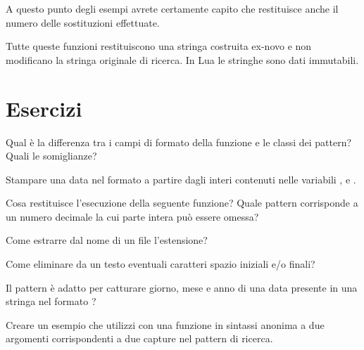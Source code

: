 A questo punto degli esempi avrete certamente capito che  restituisce
anche il numero delle sostituzioni effettuate.

Tutte queste funzioni restituiscono una stringa costruita ex-novo e non
modificano la stringa originale di ricerca. In Lua le stringhe sono dati
immutabili.



\section{Esercizi}

\begin{Exercise}[label=libstd-01]
Qual è la differenza tra i campi di formato della funzione  e
le classi dei pattern? Quali le somiglianze?
\end{Exercise}

\begin{Exercise}[label=libstd-02]
Stampare una data nel formato  a partire dagli interi contenuti
nelle variabili ,  e .
\end{Exercise}

\begin{Exercise}[label=libstd-03]
Cosa restituisce l'esecuzione della seguente funzione?
Quale pattern corrisponde a un numero decimale la cui parte intera può essere
omessa?
\end{Exercise}

\begin{Exercise}[label=libstd-04]
Come estrarre dal nome di un file l'estensione?
\end{Exercise}

\begin{Exercise}[label=libstd-05]
Come eliminare da un testo eventuali caratteri spazio iniziali e/o finali?
\end{Exercise}

\begin{Exercise}[label=libstd-06]
Il pattern  è adatto per catturare giorno, mese e
anno di una data presente in una stringa nel formato ?
\end{Exercise}

\begin{Exercise}[label=libstd-07]
Creare un esempio che utilizzi  con una funzione in sintassi
anonima a due argomenti corrispondenti a due capture nel pattern di ricerca.
\end{Exercise}


